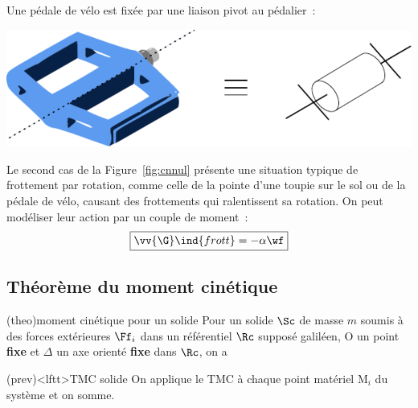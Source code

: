 \documentclass[../../main/main.tex]{subfiles}
\begin{document}
\begin{tcb*}
\begin{isd}
\begin{isd}
			\label{fig:cnnul}
		\end{isd}
		\tcblower
		Une pédale de vélo est fixée par une liaison pivot au pédalier~:
		\begin{center}
			\includegraphics[width=\linewidth]{pedale.pdf}
		\end{center}
	\end{isd}
	Le second cas de la Figure~\ref{fig:cnnul} présente une situation typique de
	frottement par rotation, comme celle de la pointe d'une toupie sur le sol ou
	de la pédale de vélo, causant des frottements qui ralentissent sa rotation. On
	peut modéliser leur action par un couple de moment~:
	\[
		\boxed{\vv{\G}\ind{frott} = -\alpha\wf}
	\]
\end{tcb*}

\subsection{Théorème du moment cinétique}
\begin{tcb*}(theo){moment cinétique pour un solide}
	Pour un solide $\Sc$ de masse $m$ soumis à des forces extérieures $\Ff_i$ dans
	un référentiel $\Rc$ supposé galiléen, O un point \textbf{fixe} et $\Delta$ un
	axe orienté \textbf{fixe} dans $\Rc$, on a
	\smallbreak
	\begin{isd}
		\psw{
			\[
				\boxed{\dv{\Lcf_{\Or/\Rc}(\Sc)}{t} = \Mcf_{\Or, \ext}}
			\]
		}
		\vspace{-15pt}
		\tcblower
		\psw{
			\[
				\boxed{\dv{\Lc_{\D/\Rc}(\Sc)}{t} = \Mc_{\D, \ext}}
			\]
		}
		\vspace{-15pt}
	\end{isd}
\end{tcb*}

\begin{tcb*}(prev)<lftt>{TMC solide}
	On applique le TMC à chaque point matériel M$_i$ du système et on somme.
\end{tcb*}
\end{document}
